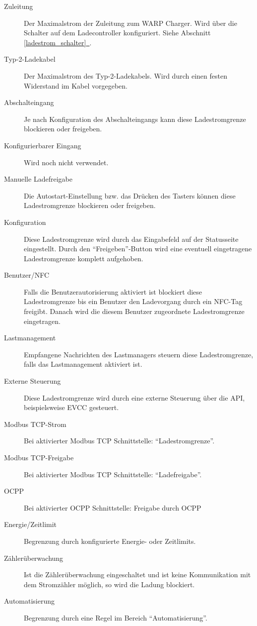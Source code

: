 \documentclass[a4paper,10pt]{article}
\newcommand*{\fullref}[1]{Abschnitt \hyperref[{#1}]{\ref*{#1}~\nameref*{#1}}}
\begin{document}
\begin{multicols*}{2}
    \begin{description}
        \item[Zuleitung] Der Maximalstrom der Zuleitung zum WARP Charger.
            Wird über die Schalter auf dem Ladecontroller konfiguriert. Siehe \fullref{ladestrom_schalter}.
        \item[Typ-2-Ladekabel] Der Maximalstrom des Typ-2-Ladekabels. Wird durch einen festen Widerstand im Kabel vorgegeben.
        \item[Abschalteingang] Je nach Konfiguration des Abschalteingangs kann diese Ladestromgrenze blockieren oder freigeben.
        \item[Konfigurierbarer Eingang] Wird noch nicht verwendet.
        \item[Manuelle Ladefreigabe] Die Autostart-Einstellung bzw. das Drücken des Tasters können diese Ladestromgrenze blockieren oder freigeben.
        \item[Konfiguration] Diese Ladestromgrenze wird durch das Eingabefeld auf der Statusseite eingestellt.
            Durch den \enquote{Freigeben}-Button wird eine eventuell eingetragene Ladestromgrenze komplett aufgehoben.
        \item[Benutzer/NFC] Falls die Benutzerautorisierung aktiviert ist blockiert diese Ladestromgrenze bis ein Benutzer den Ladevorgang durch ein NFC-Tag freigibt.
            Danach wird die diesem Benutzer zugeordnete Ladestromgrenze eingetragen.
        \item[Lastmanagement] Empfangene Nachrichten des Lastmanagers steuern diese Ladestromgrenze, falls das Lastmanagement aktiviert ist.
        \item[Externe Steuerung] Diese Ladestromgrenze wird durch eine externe Steuerung über die API, beispielsweise EVCC gesteuert.
        \item[Modbus TCP-Strom] Bei aktivierter Modbus TCP Schnittstelle: \enquote{Ladestromgrenze}.
        \item[Modbus TCP-Freigabe] Bei aktivierter Modbus TCP Schnittstelle: \enquote{Ladefreigabe}.
        \item[OCPP] Bei aktivierter OCPP Schnittstelle: Freigabe durch OCPP
        \item[Energie/Zeitlimit] Begrenzung durch konfigurierte Energie- oder Zeitlimits.
        \item[Zählerüberwachung] Ist die Zählerüberwachung eingeschaltet und ist keine Kommunikation mit dem Stromzähler möglich, so wird die Ladung blockiert.
        \item[Automatisierung] Begrenzung durch eine Regel im Bereich \enquote{Automatisierung}.
    \end{description}



\end{multicols*}
\end{document}

